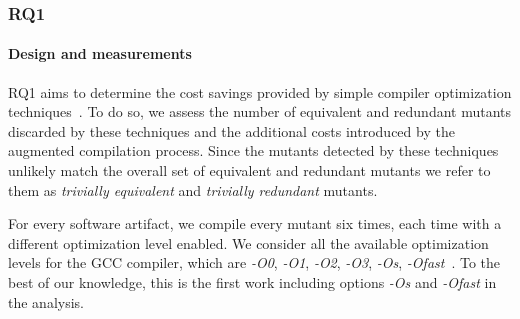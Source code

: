 




%

\subsubsection{RQ1}




\paragraph{Design and measurements}

RQ1 aims to determine the cost savings provided by simple compiler optimization techniques~\cite{papadakis2015trivial,kintis2017detecting}. To do so, we assess the number of equivalent and redundant mutants discarded by these techniques and the additional costs introduced by the augmented compilation process. Since the mutants detected by these techniques unlikely match the overall set of equivalent and redundant mutants we refer to them as \emph{trivially equivalent} and \emph{trivially redundant} mutants.

For every software artifact, we compile every mutant six times, each time with a different optimization level enabled. We consider all the available optimization levels for the GCC compiler, which are \emph{-O0}, \emph{-O1}, \emph{-O2}, \emph{-O3}, \emph{-Os},
 \emph{-Ofast}~\cite{GCCopt}. To the best of our knowledge, this is the first work including options \emph{-Os} and
 \emph{-Ofast} in the analysis.
 

